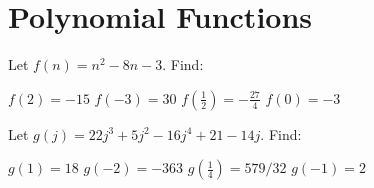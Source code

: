 \section*{Polynomial Functions}
Let $f(n)=n^2-8n-3$.  Find:
\begin{smenum}
\mitemxxxx
{$f(2)=-15$}
{$f(-3)=30$}
{$f(\frac{1}{2})=-\frac{27}{4}$}
{$f(0)=-3$}
\end{smenum}
Let $g(j)=22j^3+5j^2-16j^4+21-14j$.  Find:
\begin{smenum}
\mitemxxxx
{$g(1)=18$}
{$g(-2)=-363$}
{$g(\frac{1}{4})=579/32$}
{$g(-1)=2$}
\end{smenum}

